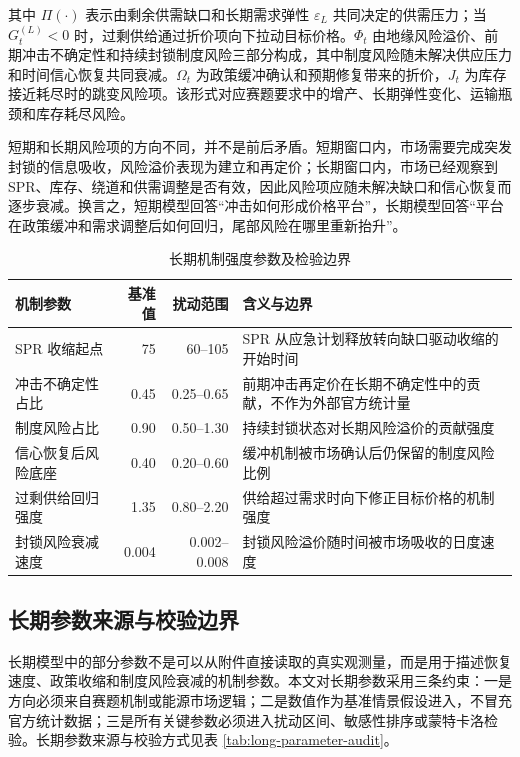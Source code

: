 其中 $\Pi(\cdot)$ 表示由剩余供需缺口和长期需求弹性 $\varepsilon_L$ 共同决定的供需压力；当 $G_t^{(L)}<0$ 时，过剩供给通过折价项向下拉动目标价格。$\Phi_t$ 由地缘风险溢价、前期冲击不确定性和持续封锁制度风险三部分构成，其中制度风险随未解决供应压力和时间信心恢复共同衰减。$\Omega_t$ 为政策缓冲确认和预期修复带来的折价，$J_t$ 为库存接近耗尽时的跳变风险项。该形式对应赛题要求中的增产、长期弹性变化、运输瓶颈和库存耗尽风险。

短期和长期风险项的方向不同，并不是前后矛盾。短期窗口内，市场需要完成突发封锁的信息吸收，风险溢价表现为建立和再定价；长期窗口内，市场已经观察到 SPR、库存、绕道和供需调整是否有效，因此风险项应随未解决缺口和信心恢复而逐步衰减。换言之，短期模型回答“冲击如何形成价格平台”，长期模型回答“平台在政策缓冲和需求调整后如何回归，尾部风险在哪里重新抬升”。

\begin{table}[htbp]
\centering
\caption{长期机制强度参数及检验边界}
\begin{tabularx}{\linewidth}{lrrX}
\toprule
机制参数 & 基准值 & 扰动范围 & 含义与边界 \\
\midrule
SPR 收缩起点 & 75 & 60--105 & SPR 从应急计划释放转向缺口驱动收缩的开始时间 \\
冲击不确定性占比 & 0.45 & 0.25--0.65 & 前期冲击再定价在长期不确定性中的贡献，不作为外部官方统计量 \\
制度风险占比 & 0.90 & 0.50--1.30 & 持续封锁状态对长期风险溢价的贡献强度 \\
信心恢复后风险底座 & 0.40 & 0.20--0.60 & 缓冲机制被市场确认后仍保留的制度风险比例 \\
过剩供给回归强度 & 1.35 & 0.80--2.20 & 供给超过需求时向下修正目标价格的机制强度 \\
封锁风险衰减速度 & 0.004 & 0.002--0.008 & 封锁风险溢价随时间被市场吸收的日度速度 \\
\bottomrule
\end{tabularx}
\end{table}

\subsection{长期参数来源与校验边界}

长期模型中的部分参数不是可以从附件直接读取的真实观测量，而是用于描述恢复速度、政策收缩和制度风险衰减的机制参数。本文对长期参数采用三条约束：一是方向必须来自赛题机制或能源市场逻辑；二是数值作为基准情景假设进入，不冒充官方统计数据；三是所有关键参数必须进入扰动区间、敏感性排序或蒙特卡洛检验。长期参数来源与校验方式见表 \ref{tab:long-parameter-audit}。

